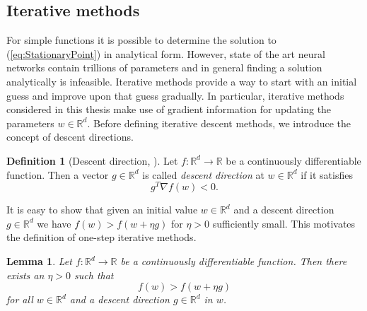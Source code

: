 \documentclass[12pt]{article}
\newtheorem{lemma}[lemma]{Lemma}
\theoremstyle{definition}
\newtheorem{definition}[definition]{Definition}
\numberwithin{equation}{section}
\newcommand{\R}{\mathbb{R}}
\begin{document}
\subsection{Iterative methods}
For simple functions it is possible to determine the solution to (\ref*{eq:StationaryPoint}) in analytical form. However, state of the art neural networks contain trillions of parameters and in general finding a solution analytically is infeasible. Iterative methods provide a way to start with an initial guess and improve upon that guess gradually. In particular, iterative methods considered in this thesis make use of gradient information for updating the parameters $w \in \mathbb{R}^d$. Before defining iterative descent methods, we introduce the concept of descent directions. 
\begin{definition}[Descent direction, ]
  Let $f: \mathbb{R}^d \rightarrow \mathbb{R}$ be a continuously differentiable function. Then a vector $g \in \mathbb{R}^d$ is called \emph{descent direction} at $w \in \mathbb{R}^d$ if it satisfies 
  \begin{equation}
    g^T \nabla f(w) < 0.
  \end{equation} 
\end{definition}
It is easy to show that given an initial value $w \in \mathbb{R}^d$ and a descent direction $g \in \mathbb{R}^d$ we have $f(w) > f(w + \eta g)$ for $\eta > 0$ sufficiently small. This motivates the definition of one-step iterative methods.
\begin{lemma}
  Let $f : \R^d \rightarrow \R$ be a continuously differentiable function. Then there exists an $\eta > 0$ such that
  \begin{equation}
    f(w) > f(w + \eta g)
  \end{equation}
  for all $w \in \R^d$ and a descent direction $g \in \R^d$ in $w$.
\end{lemma}
\end{document}
